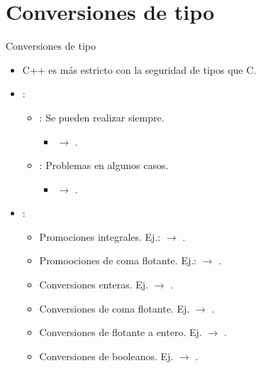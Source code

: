 \section{Conversiones de tipo}

\begin{frame}{Conversiones de tipo}
\begin{itemize}
  \item C++ es más estricto con la seguridad de tipos que C.
  \item {}:
    \begin{itemize}
      \item {}: Se pueden realizar siempre.
        \begin{itemize}
          \item {} $\rightarrow$ .
        \end{itemize}
      \item {}: Problemas en algunos casos.
        \begin{itemize}
          \item {} $\rightarrow$ .
        \end{itemize}
    \end{itemize}
  \item {}:
    \begin{itemize}
      \item Promociones integrales. Ej.:  $\rightarrow$ .
      \item Promoociones de coma flotante. Ej.:  $\rightarrow$ .
      \item Conversiones enteras. Ej.  $\rightarrow$ .
      \item Conversiones de coma flotante. Ej.  $\rightarrow$ .
      \item Conversiones de flotante a entero. Ej.  $\rightarrow$ .
      \item Conversiones de booleanos. Ej.  $\rightarrow$ .
    \end{itemize}
\end{itemize}
\end{frame}

